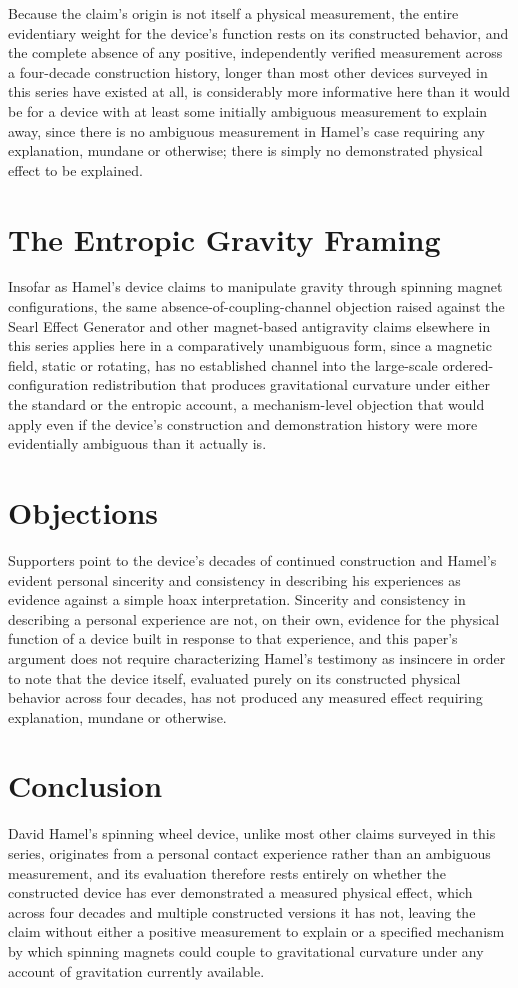 \documentclass[11pt]{article}
\begin{document}
Because the claim's origin is not itself a physical measurement, the entire evidentiary weight for the device's function rests on its constructed behavior, and the complete absence of any positive, independently verified measurement across a four-decade construction history, longer than most other devices surveyed in this series have existed at all, is considerably more informative here than it would be for a device with at least some initially ambiguous measurement to explain away, since there is no ambiguous measurement in Hamel's case requiring any explanation, mundane or otherwise; there is simply no demonstrated physical effect to be explained.

\section{The Entropic Gravity Framing}

Insofar as Hamel's device claims to manipulate gravity through spinning magnet configurations, the same absence-of-coupling-channel objection raised against the Searl Effect Generator and other magnet-based antigravity claims elsewhere in this series applies here in a comparatively unambiguous form, since a magnetic field, static or rotating, has no established channel into the large-scale ordered-configuration redistribution that produces gravitational curvature under either the standard or the entropic account, a mechanism-level objection that would apply even if the device's construction and demonstration history were more evidentially ambiguous than it actually is.

\section{Objections}

Supporters point to the device's decades of continued construction and Hamel's evident personal sincerity and consistency in describing his experiences as evidence against a simple hoax interpretation. Sincerity and consistency in describing a personal experience are not, on their own, evidence for the physical function of a device built in response to that experience, and this paper's argument does not require characterizing Hamel's testimony as insincere in order to note that the device itself, evaluated purely on its constructed physical behavior across four decades, has not produced any measured effect requiring explanation, mundane or otherwise.

\section{Conclusion}

David Hamel's spinning wheel device, unlike most other claims surveyed in this series, originates from a personal contact experience rather than an ambiguous measurement, and its evaluation therefore rests entirely on whether the constructed device has ever demonstrated a measured physical effect, which across four decades and multiple constructed versions it has not, leaving the claim without either a positive measurement to explain or a specified mechanism by which spinning magnets could couple to gravitational curvature under any account of gravitation currently available.
\end{document}
